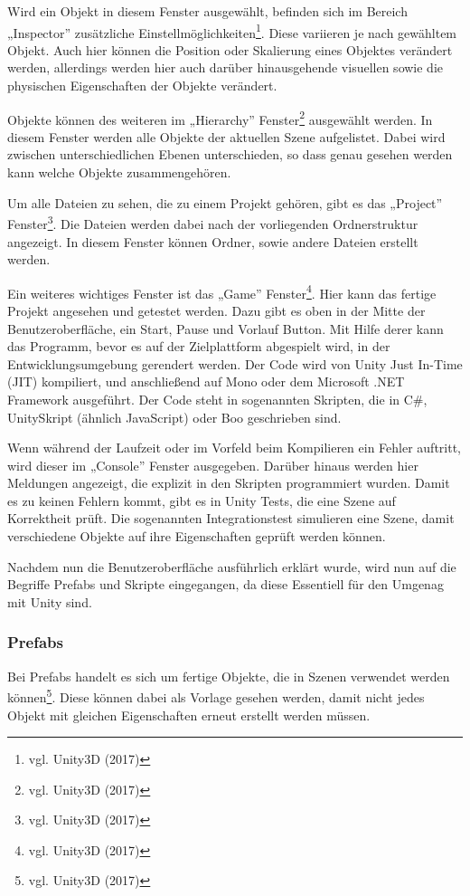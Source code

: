 		Wird ein Objekt in diesem Fenster ausgewählt, befinden sich im Bereich „Inspector” zusätzliche Einstellmöglichkeiten\footnote{vgl. Unity3D \cite{unity3} (2017)}. Diese variieren je nach gewähltem Objekt. Auch hier können die Position oder Skalierung eines Objektes verändert werden, allerdings werden hier auch darüber hinausgehende visuellen sowie die physischen Eigenschaften der Objekte verändert.
	
		Objekte können des weiteren im „Hierarchy” Fenster\footnote{vgl. Unity3D \cite{unity4} (2017)} ausgewählt werden. In diesem Fenster werden alle Objekte der aktuellen Szene aufgelistet. Dabei wird zwischen unterschiedlichen Ebenen unterschieden, so dass genau gesehen werden kann welche Objekte zusammengehören. 
	
		Um alle Dateien zu sehen, die zu einem Projekt gehören, gibt es das „Project” Fenster\footnote{vgl. Unity3D \cite{unity5} (2017)}. Die Dateien werden dabei nach der vorliegenden Ordnerstruktur angezeigt. In diesem Fenster können Ordner, sowie andere Dateien erstellt werden.
	
		Ein weiteres wichtiges Fenster ist das „Game” Fenster\footnote{vgl. Unity3D \cite{unity6} (2017)}. Hier kann das fertige Projekt angesehen und getestet werden. Dazu gibt es oben in der Mitte der Benutzeroberfläche, ein Start, Pause und Vorlauf Button. Mit Hilfe derer kann das Programm, bevor es auf der Zielplattform abgespielt wird, in der Entwicklungsumgebung gerendert werden. Der Code wird von Unity Just In-Time (JIT) kompiliert, und anschließend auf Mono oder dem Microsoft .NET Framework ausgeführt. Der Code steht in sogenannten Skripten, die in C\#, UnitySkript (ähnlich JavaScript) oder Boo geschrieben sind.
	
		Wenn während der Laufzeit oder im Vorfeld beim Kompilieren ein Fehler auftritt, wird dieser im „Console” Fenster ausgegeben. Darüber hinaus werden hier Meldungen angezeigt, die explizit in den Skripten programmiert wurden. Damit es zu keinen Fehlern kommt, gibt es in Unity Tests, die eine Szene auf Korrektheit prüft. Die sogenannten Integrationstest simulieren eine Szene, damit verschiedene Objekte auf ihre Eigenschaften geprüft werden können. 
	
		Nachdem nun die Benutzeroberfläche ausführlich erklärt wurde, wird nun auf die Begriffe Prefabs und Skripte eingegangen, da diese Essentiell für den Umgenag mit Unity sind.
	
		\subsubsection{Prefabs}
			Bei Prefabs handelt es sich um fertige Objekte, die in Szenen verwendet werden können\footnote{vgl. Unity3D \cite{unity7} (2017)}. Diese können dabei als Vorlage gesehen werden, damit nicht jedes Objekt mit gleichen Eigenschaften erneut erstellt werden müssen. 
			
